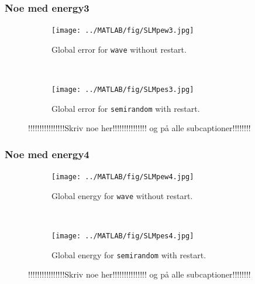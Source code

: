 \subsubsection{Noe med energy3}%
\begin{figure}[H]
        \centering
        \begin{subfigure}[b]{0.45\textwidth}
                \texttt{[image: ../MATLAB/fig/SLMpew3.jpg]}
                \caption{Global error for \texttt{wave} without restart.}
                \label{fig:SLMpew3}
        \end{subfigure}
		~
        \begin{subfigure}[b]{0.45\textwidth}
                \texttt{[image: ../MATLAB/fig/SLMpes3.jpg]}
                \caption{Global error for \texttt{semirandom} with restart.}
                \label{fig:SLMpes3}
        \end{subfigure}
		
        \caption{ !!!!!!!!!!!!!!!!Skriv noe her!!!!!!!!!!!!!!! og på alle subcaptioner!!!!!!!!}
        \label{fig:SLMpe3}
\end{figure}
\subsubsection{Noe med energy4}%

\begin{figure}[H]
        \centering
        \begin{subfigure}[b]{0.45\textwidth}
                \texttt{[image: ../MATLAB/fig/SLMpew4.jpg]}
                \caption{Global energy for \texttt{wave} without restart.}
                \label{fig:SLMpew4}
        \end{subfigure}
		~
        \begin{subfigure}[b]{0.45\textwidth}
                \texttt{[image: ../MATLAB/fig/SLMpes4.jpg]}
                \caption{Global energy for \texttt{semirandom} with restart.}
                \label{fig:SLMpes4}
        \end{subfigure}
        \caption{ !!!!!!!!!!!!!!!!Skriv noe her!!!!!!!!!!!!!!! og på alle subcaptioner!!!!!!!!}
        \label{fig:SLMpe4x}
\end{figure}

